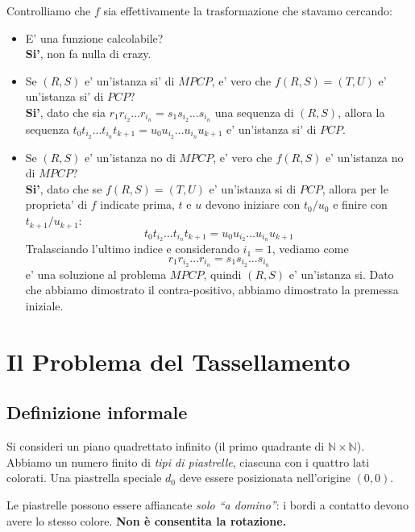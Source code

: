 Controlliamo che $ f $ sia effettivamente la trasformazione che stavamo cercando:
\begin{itemize}
\item E' una funzione calcolabile?\\
  \textbf{Si'}, non fa nulla di crazy.
\item Se $ (R,S) $ e' un'istanza si' di $ MPCP $, e' vero che $ f(R,S) = (T,U) $ e' un'istanza si' di $ PCP $?\\
  \textbf{Si'}, dato che sia $ r_1r_{i_2}...r_{i_n} = s_1s_{i_2}...s_{i_n} $ una sequenza di $ (R,S) $, allora la sequenza $ t_0t_{i_2}...t_{i_n}t_{k+1} = u_0u_{i_2}...u_{i_n} u_{k+1} $ e' un'istanza si' di $ PCP $.
\item Se $ (R,S)$ e' un'istanza no di $ MPCP $, e' vero che $ f(R,S) $ e' un'istanza no di $ MPCP $?\\
  \textbf{Si'}, dato che se $ f(R,S) = (T,U) $ e' un'istanza si di $ PCP $, allora per le proprieta' di $ f $ indicate prima, $ t $ e $ u $ devono iniziare con $ t_0/u_0 $ e finire con $ t_{k+1}/u_{k+1} $:
    \[
    t_0t_{i_2}...t_{i_n}t_{k+1} = u_0u_{i_2}...u_{i_n}u_{k+1}
    \]
    Tralasciando l'ultimo indice e considerando $ i_1 = 1 $, vediamo come
    \[
    r_1r_{i_2}...r_{i_n} = s_1s_{i_2}...s_{i_n}
    \]
    e' una soluzione al problema $ MPCP $, quindi $ (R,S) $ e' un'istanza si. Dato che abbiamo dimostrato il contra-positivo, abbiamo dimostrato la premessa iniziale.
\end{itemize}

\section{Il Problema del Tassellamento}
 
\subsection{Definizione informale}
 
Si consideri un piano quadrettato infinito (il primo quadrante di $\mathbb{N}\times\mathbb{N}$).
Abbiamo un numero finito di \emph{tipi di piastrelle}, ciascuna con i quattro lati
colorati. Una piastrella speciale $d_0$ deve essere posizionata nell'origine
$(0,0)$.
 
Le piastrelle possono essere affiancate \emph{solo ``a domino''}: i bordi a contatto
devono avere lo stesso colore. \textbf{Non è consentita la rotazione.}
 
\begin{center}
\end{center}
 
